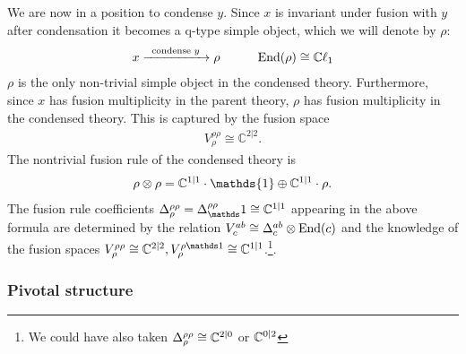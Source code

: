We are now in a position to condense $y$.
Since $x$ is invariant under fusion with $y$ after condensation it becomes a q-type simple object, which we will denote by $\rho$:
\begin{align}
x \xrightarrow{\;\; \text{condense $y$\;\;}} \rho \quad \quad \quad \text{End}(\rho) \cong \mathbb{C} \ell_1
\end{align}
$\rho$ is the only non-trivial simple object in the condensed theory. 
Furthermore, since $x$ has fusion multiplicity in the parent theory, $\rho$ has fusion multiplicity in the condensed theory.
This is captured by the fusion space
\begin{align}
V^{\rho \rho}_\rho \cong \mathbb{C}^{2|2}.
\end{align}
The nontrivial fusion rule of the condensed theory is
\begin{align}
\rho \tp \rho = \mathbb{C}^{1|1}\cdot \mathds{1} \oplus \mathbb{C}^{1|1} \cdot \rho.
\end{align}
The fusion rule coefficients $\Delta^{\rho\rho}_\rho = \Delta^{\rho\rho}_\unit \cong \cc^{1|1}$ 
appearing in the above formula are determined by the relation $V^{ab}_c \cong \Delta^{ab}_c \otimes \text{End}(c)$ and the 
knowledge of the fusion spaces $V^{\rho\rho}_\rho \cong \cc^{2|2}, V^{\rho \unit}_\rho \cong \cc^{1|1}$.\footnote{We could have 
also taken $\Delta^{\rho \rho}_\rho \cong \mathbb{C}^{2|0}$ or $ \mathbb{C}^{0|2}$
}.






\subsubsection{Pivotal structure}
\label{ESixPivotal}

